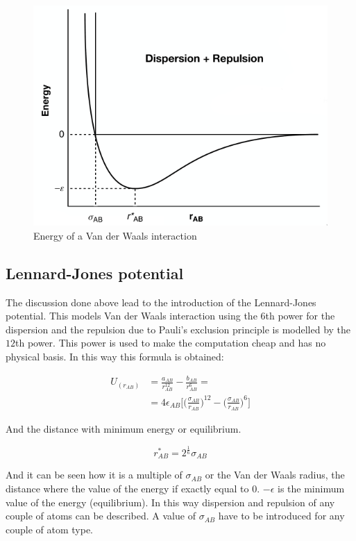 \begin{figure}[H]
	\includegraphics[width=\textwidth]{van-der-waals}
	\caption{Energy of a Van der Waals interaction}
	\label{fig:van-der-waals}
\end{figure}

	\subsection{Lennard-Jones potential}
	The discussion done above lead to the introduction of the Lennard-Jones potential.
	This models Van der Waals interaction using the $6$th power for the dispersion and the repulsion due to Pauli's exclusion principle is modelled by the $12$th power.
	This power is used to make the computation cheap and has no physical basis.
	In this way this formula is obtained:

	\begin{align*}
		U_(r_{AB}) &= \frac{a_{AB}}{r^{12}_{AB}}-\frac{b_{AB}}{r^6_{AB}}=\\
							 &= 4\epsilon_{AB}\biggl[\biggl(\frac{\sigma_{AB}}{r_{AB}}\biggr)^{12}-\biggl(\frac{\sigma_{AB}}{r_{AB}}\biggr)^6\biggr]
	\end{align*}

	And the distance with minimum energy or equilibrium.

	$$r^*_{AB} = 2^{\frac{1}{6}}\sigma_{AB}$$

	And it can be seen how it is a multiple of $\sigma_{AB}$ or the Van der Waals radius, the distance where the value of the energy if exactly equal to $0$.
	$-\epsilon$ is the minimum value of the energy (equilibrium).
	In this way dispersion and repulsion of any couple of atoms can be described.
	A value of $\sigma_{AB}$ have to be introduced for any couple of atom type.

